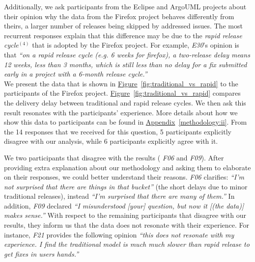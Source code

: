 Additionally, we ask participants from the Eclipse and ArgoUML projects about
their opinion \DIFdelbegin {}\DIFdelend \DIFaddbegin {}\DIFaddend why the data from the Firefox project behaves differently from
theirs, \ie a larger number of releases being skipped by addressed issues. The
most recurrent responses explain that this difference may be due to the {\em
rapid release cycle}$^{(4)}$ that is adopted by the Firefox project. For
example, {\em E30}'s opinion is that {\em ``on a rapid release cycle
	(e.g. 6 weeks for firefox), a two-release delay means 12 weeks,
	less than 3 months, which is still less than no delay for a fix
submitted early in a project with a 6-month release cycle.''} 
\\           

\noindent\DIFdelbegin \textit{\textbf{}%
}%
\DIFdelend \DIFaddbegin {}
\DIFaddend We present the data that is shown in
\hyperref[fig:traditional_vs_rapid]{Figure}~\ref{fig:traditional_vs_rapid} to
the participants of the Firefox project.
\hyperref[fig:traditional_vs_rapid]{Figure}~\ref{fig:traditional_vs_rapid}
compares the delivery delay between traditional and rapid release cycles. We
then ask \DIFdelbegin {}\DIFdelend \DIFaddbegin {}\DIFaddend this result resonates with the participants' experience. More
details about how we show this data to participants can be found in
\hyperref[methodology:ii]{Appendix}~\ref{methodology:ii}. From the 14 responses
that we received for this question, 5 participants explicitly disagree with our
analysis, while 6 participants explicitly agree with it. 

We \DIFdelbegin {}\DIFdelend \DIFaddbegin {}\DIFaddend two participants that disagree with the results ({\em
F06} and {\em F09}). After providing extra explanation about our methodology and
asking them to elaborate on their responses, we could better understand their
reasons.  {\em F06} clarifies: {\em ``I'm not surprised that there are things in
that bucket''} (the short delays due to minor traditional releases), instead
{\em ``I'm surprised that there are many of them.''} In addition, {\em F09}
declared {\em ``I misunderstood [your] question, but now it [(the data)] makes
sense.''} With respect to the remaining participants that disagree with our
results, they inform us that the data does not resonate with their experience.
For instance, {\em F21} provides the following opinion {\em ``this does not
resonate with my experience. I find the traditional model is much much slower
than rapid release to get fixes in users hands.''} \DIFaddbegin {}\DIFaddend 

